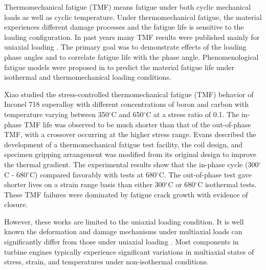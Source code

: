 Thermomechanical fatigue (TMF) means fatigue under both cyclic mechanical loads as well as cyclic temperature. Under thermomechanical fatigue, the material experiences different damage processes and the fatigue life is sensitive to the loading configuration. In past years many TMF results were published mainly for uniaxial loading \cite{Evans2008, Kulawinski2015, remy2003thermal, Bauer2009}. The primary goal was to demonstrate effects of the loading phase angles and to correlate fatigue life with the phase angle. Phenomenological fatigue models were proposed in \cite{Vose2013} to predict the material fatigue life under isothermal and thermomechanical loading conditions. 

Xiao \cite{Xiao2006157} studied the stress-controlled thermomechanical fatigue (TMF) behavior of Inconel 718 superalloy with different concentrations of boron and carbon with temperature varying between 350$^{\circ}$C and 650$^{\circ}$C at a stress ratio of 0.1. The in-phase TMF life was observed to be much shorter than that of the out-of-phase TMF, with a crossover occurring at the higher stress range.
Evans \cite{evans2008thermo} described the development of a thermomechanical fatigue test facility, the coil design, and specimen gripping arrangement was modified from its original design to improve the thermal gradient.
The experimental results show that the in-phase cycle (300$^{\circ}$C - 680$^{\circ}$C) compared favorably with tests at 680$^{\circ}$C.
The out-of-phase test gave shorter lives on a strain range basis than either 300$^{\circ}$C or 680$^{\circ}$C isothermal tests.
These TMF failures were dominated by fatigue crack growth with evidence of closure.

However, these works are limited to the uniaxial loading condition.
It is well known the deformation and damage mechanisms under multiaxial loads can significantly differ from those under uniaxial loading \cite{fang2015cyclic,kang2004uniaxial,chen2004modified}. Most components in turbine engines typically experience significant variations in multiaxial states of stress, strain, and temperatures under non-isothermal conditions. 

